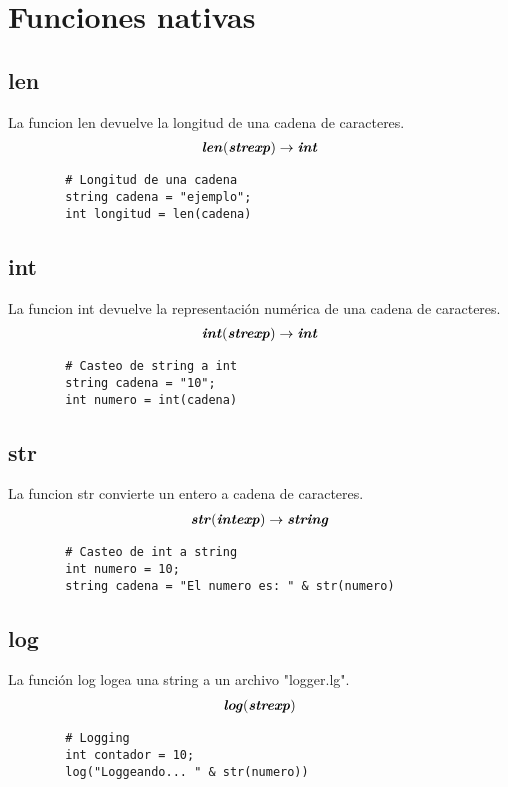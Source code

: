 \documentclass{article}
\begin{document}
    \newpage
    \section{Funciones nativas}
    \subsection{len}
    La funcion len devuelve la longitud de una cadena de caracteres.
    \begin{align} 
        \textbf{\textit{len}}( \textbf{\textit{strexp}} ) \rightarrow \textbf{\textit{int}}
    \end{align}
    \begin{lstlisting}
        # Longitud de una cadena
        string cadena = "ejemplo";
        int longitud = len(cadena)
    \end{lstlisting}
    \subsection{int}
    La funcion int devuelve la representación numérica de una cadena de caracteres.
    \begin{align} 
        \textbf{\textit{int}}( \textbf{\textit{strexp}} ) \rightarrow \textbf{\textit{int}}
    \end{align}
    \begin{lstlisting}
        # Casteo de string a int
        string cadena = "10";
        int numero = int(cadena)
    \end{lstlisting}
    \subsection{str}
    La funcion str convierte un entero a cadena de caracteres.
    \begin{align} 
        \textbf{\textit{str}} ( \textbf{\textit{intexp}} ) \rightarrow \textbf{\textit{string}}
    \end{align}
    \begin{lstlisting}
        # Casteo de int a string
        int numero = 10;
        string cadena = "El numero es: " & str(numero) 
    \end{lstlisting}
    \subsection{log}
    La función log logea una string a un archivo "logger.lg".
    \begin{align} 
        \textbf{\textit{log}} ( \textbf{\textit{strexp}} )
    \end{align}
    \begin{lstlisting}
        # Logging
        int contador = 10;
        log("Loggeando... " & str(numero)) 
    \end{lstlisting}
\end{document}
